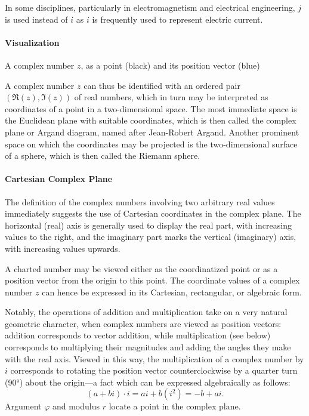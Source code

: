 In some disciplines, particularly in electromagnetism and electrical engineering, $j$ is used instead of $i$ as $i$ is frequently used to represent electric current.

\paragraph{Visualization}

A complex number $z$, as a point (black) and its position vector (blue)

A complex number $z$ can thus be identified with an ordered pair $\left( \Re(z), \Im(z) \right)$ of real numbers, which in turn may be interpreted as coordinates of a point in a two-dimensional space. The most immediate space is the Euclidean plane with suitable coordinates, which is then called the complex plane or Argand diagram, named after Jean-Robert Argand. Another prominent space on which the coordinates may be projected is the two-dimensional surface of a sphere, which is then called the Riemann sphere.

\paragraph{Cartesian Complex Plane}

The definition of the complex numbers involving two arbitrary real values immediately suggests the use of Cartesian coordinates in the complex plane. The horizontal (real) axis is generally used to display the real part, with increasing values to the right, and the imaginary part marks the vertical (imaginary) axis, with increasing values upwards.

A charted number may be viewed either as the coordinatized point or as a position vector from the origin to this point. The coordinate values of a complex number $z$ can hence be expressed in its Cartesian, rectangular, or algebraic form.

Notably, the operations of addition and multiplication take on a very natural geometric character, when complex numbers are viewed as position vectors: addition corresponds to vector addition, while multiplication (see below) corresponds to multiplying their magnitudes and adding the angles they make with the real axis. Viewed in this way, the multiplication of a complex number by $i$ corresponds to rotating the position vector counterclockwise by a quarter turn (90°) about the origin—a fact which can be expressed algebraically as follows:
$$
(a + bi) \cdot i = ai + b(i^2) = -b + ai.
$$
Argument $\varphi$ and modulus $r$ locate a point in the complex plane.

